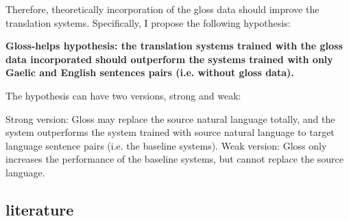 \documentclass[a4paper]{article}
\begin{document}
Therefore, \citep{2017opennmt} theoretically incorporation of the gloss data should improve the translation systems. Specifically, I propose the following hypothesis:
\begin{exe}  
\ex \textbf{Gloss-helps hypothesis: the translation systems trained with the gloss data incorporated should outperform the systems trained with only Gaelic and English sentences pairs (i.e. without gloss data).}

The hypothesis can have two versions, strong and weak:
	\begin{xlist}
	\ex \label{strong_hy} Strong version: Gloss may replace the source natural language totally, and the system outperforms the system trained with source natural language to target language sentence pairs (i.e. the baseline systems).   
	\ex \label{weak_hy} Weak version: Gloss only increases the performance of the baseline systems, but cannot replace the source language. 
	\end{xlist}
\end{exe}
\subsection{literature}



\end{document}
